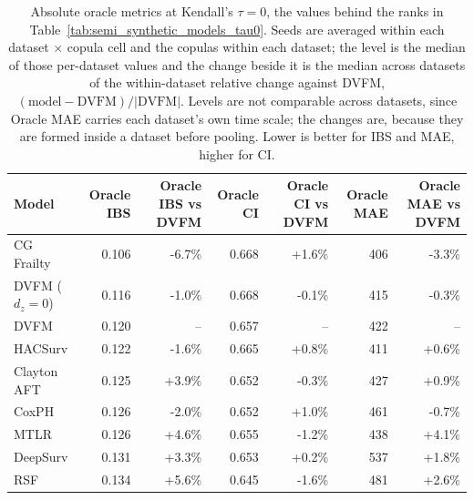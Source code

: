 \begin{table}
\caption{Absolute oracle metrics at Kendall's $\tau=0$, the values behind the ranks in Table~\ref{tab:semi_synthetic_models_tau0}. Seeds are averaged within each dataset $\times$ copula cell and the copulas within each dataset; the level is the median of those per-dataset values and the change beside it is the median across datasets of the within-dataset relative change against DVFM, $(\text{model} - \text{DVFM})/|\text{DVFM}|$. Levels are not comparable across datasets, since Oracle MAE carries each dataset's own time scale; the changes are, because they are formed inside a dataset before pooling. Lower is better for IBS and MAE, higher for CI.}
\label{tab:semi_synthetic_absolute_metrics_tau0}
\begin{tabular}{lrrrrrr}
\toprule
Model & Oracle IBS & Oracle IBS vs DVFM & Oracle CI & Oracle CI vs DVFM & Oracle MAE & Oracle MAE vs DVFM \\
\midrule
CG Frailty & 0.106 & -6.7\% & 0.668 & +1.6\% & 406 & -3.3\% \\
DVFM ($d_z{=}0$) & 0.116 & -1.0\% & 0.668 & -0.1\% & 415 & -0.3\% \\
DVFM & 0.120 & -- & 0.657 & -- & 422 & -- \\
HACSurv & 0.122 & -1.6\% & 0.665 & +0.8\% & 411 & +0.6\% \\
Clayton AFT & 0.125 & +3.9\% & 0.652 & -0.3\% & 427 & +0.9\% \\
CoxPH & 0.126 & -2.0\% & 0.652 & +1.0\% & 461 & -0.7\% \\
MTLR & 0.126 & +4.6\% & 0.655 & -1.2\% & 438 & +4.1\% \\
DeepSurv & 0.131 & +3.3\% & 0.653 & +0.2\% & 537 & +1.8\% \\
RSF & 0.134 & +5.6\% & 0.645 & -1.6\% & 481 & +2.6\% \\
\bottomrule
\end{tabular}
\end{table}
